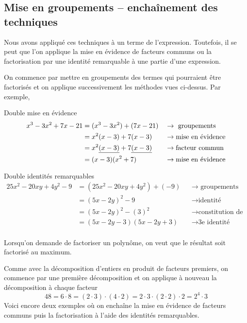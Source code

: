 \documentclass[a4paper,12pt]{report}
\begin{document}
\subsection{Mise en groupements -- enchaînement des techniques}
Nous avons appliqué ces techniques à un terme de l'expression.
Toutefois, il se peut que l'on applique la mise en évidence de facteurs communs ou la factorisation par une identité remarquable à une partie d'une expression. 

On commence par mettre en groupements des termes qui pourraient être factorisés et on applique successivement les méthodes vues ci-dessus.
Par exemple,
\begin{tasks}
	\task Double mise en évidence \vspace{-1em}\begin{align*}
	x^3-3x^2+7x-21&=(x^3-3x^2)+(7x-21) &&\rightarrow\text{ groupements}\\
		      &=x^2(x-3)+7(x-3)&&\rightarrow \text{mise en évidence}\\
		      &=x^2\uline{(x-3)}+7\uline{(x-3)}&&\rightarrow \text{facteur commun}\\
		      &=(x-3)(x^2+7)&&\rightarrow \text{mise en évidence}
\end{align*}

\task Double identités remarquables	
\vspace{-1em}\begin{align*}
	25x^2-20xy+4y^2-9&=(25x^2-20xy+4y^2)+(-9)&&\rightarrow \text{ groupements}\\
		      &=(5x-2y)^2-9&&\rightarrow \text{identité remarquable}\\
		      &=(5x-2y)^2-(3)^2&& \rightarrow \text{constitution de l'identité}\\
		      &=(5x-2y-3)(5x-2y+3)&&\rightarrow \text{3e identité remarquable}\\
\end{align*}
		\end{tasks}
		\vspace{-1cm}
\begin{rem}
	Lorsqu'on demande de factoriser un polynôme, on veut que le résultat soit factorisé au maximum. 
\end{rem}
Comme avec la décomposition d'entiers en produit de facteurs premiers, on commence par une première décomposition et on applique à nouveau la décomposition à chaque facteur
	\[
	48=6\cdot 8=(2\cdot 3)\cdot (4\cdot 2)=2\cdot 3\cdot (2\cdot 2)\cdot 2=2^4\cdot 3	
\]
Voici encore deux exemples où on enchaîne la mise en évidence de facteurs communs puis la factorisation à l'aide des identités remarquables.
\end{document}

